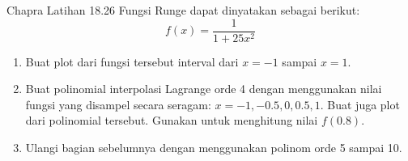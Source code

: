 \begin{soal}{Chapra Latihan 18.26}
Fungsi Runge dapat dinyatakan sebagai berikut:
\begin{equation*}
f(x) = \frac{1}{1 + 25x^2}
\end{equation*}
\begin{enumerate}[label=(\alph*)]
\item Buat plot dari fungsi tersebut interval dari $x=-1$ sampai $x=1$.
\item Buat polinomial interpolasi Lagrange orde 4 dengan menggunakan nilai
fungsi yang disampel secara seragam: $x = -1, -0.5, 0, 0.5, 1$. Buat juga
plot dari polinomial tersebut. Gunakan untuk menghitung nilai $f(0.8)$.
\item Ulangi bagian sebelumnya dengan menggunakan polinom orde 5 sampai 10.
\end{enumerate}
\end{soal}
